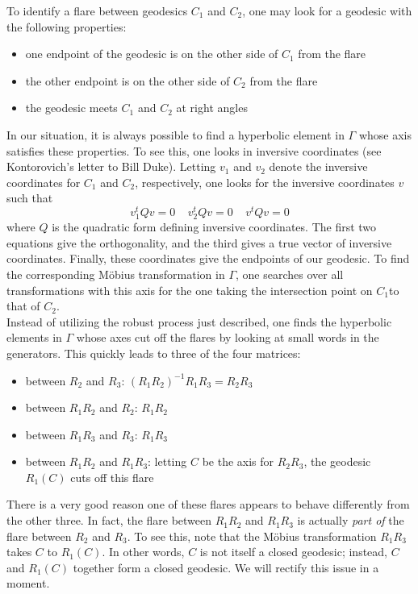 \documentclass[]{article}
\begin{document}
To identify a flare between geodesics $C_1$ and $C_2$, one may look for a geodesic with the following properties:
\begin{itemize}
	\item one endpoint of the geodesic is on the other side of $C_1$ from the flare
	\item the other endpoint is on the other side of $C_2$ from the flare
	\item the geodesic meets $C_1$ and $C_2$ at right angles
\end{itemize}
In our situation, it is always possible to find a hyperbolic element in $\Gamma$ whose axis satisfies these properties.
To see this, one looks in inversive coordinates (see Kontorovich's letter to Bill Duke).
Letting $v_1$ and $v_2$ denote the inversive coordinates for $C_1$ and $C_2$, respectively, one looks for the inversive coordinates $v$ such that
$$
v_1^tQv = 0 ~~~~~ v_2^tQv = 0 ~~~~~ v^tQv = 0
$$
where $Q$ is the quadratic form defining inversive coordinates.
The first two equations give the orthogonality, and the third gives a true vector of inversive coordinates.
Finally, these coordinates give the endpoints of our geodesic.
To find the corresponding M\"obius transformation in $\Gamma$, one searches over all transformations with this axis for the one taking the intersection point on $C_1$to that of $C_2$.
\\

Instead of utilizing the robust process just described, one finds the hyperbolic elements in $\Gamma$ whose axes cut off the flares by looking at small words in the generators.
This quickly leads to three of the four matrices:
\begin{itemize}
	\item between $R_2$ and $R_3$: $(R_1R_2)^{-1}R_1R_3 = R_2R_3$
	\item between $R_1R_2$ and $R_2$: $R_1R_2$
	\item between $R_1R_3$ and $R_3$: $R_1R_3$
	\item between $R_1R_2$ and $R_1R_3$: letting $C$ be the axis for $R_2R_3$, the geodesic $R_1(C)$ cuts off this flare
\end{itemize}
There is a very good reason one of these flares appears to behave differently from the other three.
In fact, the flare between $R_1R_2$ and $R_1R_3$ is actually \textit{part of} the flare between $R_2$ and $R_3$.
To see this, note that the M\"obius transformation $R_1R_3$ takes $C$ to $R_1(C)$.
In other words, $C$ is not itself a closed geodesic; instead, $C$ and $R_1(C)$ together form a closed geodesic.
We will rectify this issue in a moment.
\end{document}
